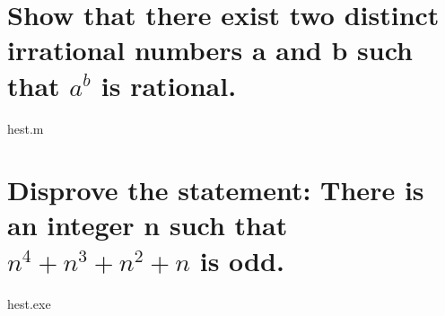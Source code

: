 \section{Show that there exist two distinct irrational numbers a and b such that $a^b$ is rational.}
hest.m

\section{Disprove the statement: There is an integer n such that $n^4+n^3+n^2+n$ is odd.}
hest.exe